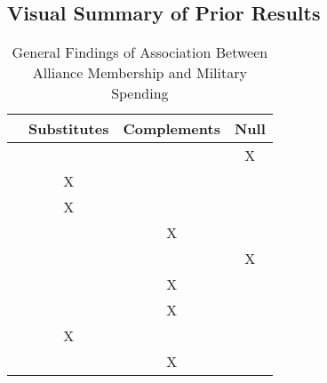 \documentclass[12pt]{article}
\begin{document}
\subsection*{Visual Summary of Prior Results} 


\begin{table}[hbt!]
\begin{tabular}{lccc}
     & Substitutes & Complements & Null \\
\hline
\citet{MostSiverson1987} &  &  & X \\
\citet{Morrow1993} & X &  &  \\ 
\citet{Conybeare1994} & X & &  \\
\citet{Diehl1994} &  & X &  \\
\citet{Goldsmith2003} &  &  & X \\
\citet{MorganPalmer2006} &  & X & \\ 
\citet{QuirozFlores2011} &  & X &  \\ 
\citet{DigiuseppePoast2016} & X & & \\ 
\citet{Horowitzetal2017} &  & X & \\ 
\hline
\end{tabular}
\caption{General Findings of Association Between Alliance Membership and Military Spending}
\end{table}









  
% 
\end{document}
